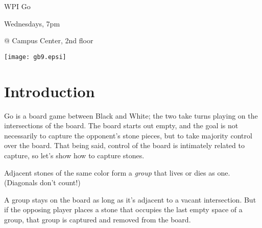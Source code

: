 \documentclass{article}
\begin{document}
\centerline{\Huge WPI Go}
\centerline{\Huge Wednesdays, 7pm}
\centerline{\Huge @ Campus Center, 2nd floor}
\vfill

\begin{center}
\texttt{[image: gb9.epsi]}
\end{center}

\vfill

\newpage

\section*{Introduction}
Go is a board game between Black and White; the two take turns playing
on the intersections of the board.  The board starts out empty, and
the goal is not necessarily to capture the opponent's stone pieces, but to
take majority control over the board.  That being said, control of the
board is intimately related to capture, so let's show how to capture
stones.

Adjacent stones of the same color form a \emph{group} that lives or
dies as one.  (Diagonals don't count!)

\begin{center}
\cleargoban
{}
\hspace{.5in}%
\hspace{.5in}%
\end{center}
%
A group stays on the board as long as it's adjacent to a vacant
intersection.  But if the opposing player places a stone that occupies
the last empty space of a group, that group is captured and removed
from the board.


\begin{center}
\end{center}
\end{document}
